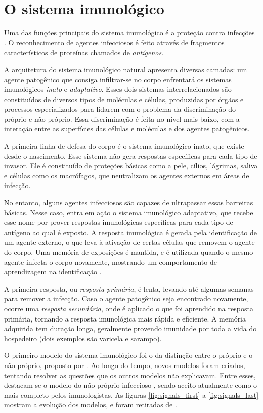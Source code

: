 \chapter{O sistema imunológico}

Uma das funções principais do sistema imunológico é a proteção contra infecções \cite{Cayzer2007}. O reconhecimento de agentes infecciosos é feito através de fragmentos característicos de proteínas chamados de \emph{antígenos}.

A arquitetura do sistema imunológico natural apresenta diversas camadas: um agente patogênico que consiga infiltrar-se no corpo enfrentará os sistemas imunológicos \emph{inato} e \emph{adaptativo}. Esses dois sistemas interrelacionados são constituídos de diversos tipos de moléculas e células, produzidas por órgãos e processos especializados para lidarem com o problema da discriminação do próprio e não-próprio. Essa discriminação é feita no nível mais baixo, com a interação entre as superfícies das células e moléculas e dos agentes patogênicos.

A primeira linha de defesa do corpo é o sistema imunológico inato, que existe desde o nascimento. Esse sistema não gera respostas específicas para cada tipo de invasor. Ele é constituído de proteções básicas como a pele, cílios, lágrimas, saliva e células como os macrófagos, que neutralizam os agentes externos em áreas de infecção.

No entanto, alguns agentes infecciosos são capazes de ultrapassar essas barreiras básicas. Nesse caso, entra em ação o sistema imunológico adaptativo, que recebe esse nome por prover respostas imunológicas específicas para cada tipo de antígeno ao qual é exposto. A resposta imunológica é gerada pela identificação de um agente externo, o que leva à ativação de certas células que removem o agente do corpo. Uma memória de exposições é mantida, e é utilizada quando o mesmo agente infecta o corpo novamente, mostrando um comportamento de aprendizagem na identificação \cite{Brownlee2011}.

A primeira resposta, ou \emph{resposta primária}, é lenta, levando até algumas semanas para remover a infecção. Caso o agente patogênico seja encontrado novamente, ocorre uma \emph{resposta secundária}, onde é aplicado o que foi aprendido na resposta primária, tornando a resposta imunológica mais rápida e eficiente. A memória adquirida tem duração longa, geralmente provendo imunidade por toda a vida do hospedeiro (dois exemplos são varicela e sarampo).

O primeiro modelo do sistema imunológico foi o da distinção entre o próprio e o não-próprio, proposto por \citet{Burnet1959}. Ao longo do tempo, novos modelos foram criados, tentando resolver as questões que os outros modelos não explicavam. Entre esses, destacam-se o modelo do não-próprio infeccioso \cite{Janeway1989}, sendo aceito atualmente como o mais completo pelos imunologistas. As figuras \ref{fig:signals_first} a \ref{fig:signals_last} mostram a evolução dos modelos, e foram retiradas de \citet{Aickelin2002}.

